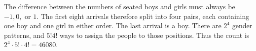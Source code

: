 The difference between the numbers of seated boys and girls must always be $-1,0,$ or $1$. The first eight arrivals therefore split into four pairs, each containing one boy and one girl in either order. The last arrival is a boy. There are $2^4$ gender patterns, and $5!4!$ ways to assign the people to those positions. Thus the count is $2^4\cdot5!\cdot4!=\boxed{46080}$.

